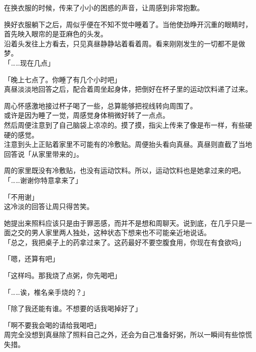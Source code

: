 在换衣服的时候，传来了小小的困惑的声音，让周感到非常抱歉。\\

\vspace{2\baselineskip}

换好衣服躺下之后，周似乎便在不知不觉中睡着了。当他使劲睁开沉重的眼睛时，首先映入眼帘的是亚麻色的头发。\\

沿着头发往上方看去，只见真昼静静站着看着周。看来刚刚发生的一切都不是做梦。\\

「……现在几点」

「晚上七点了。你睡了有几个小时吧」\\

真昼淡淡地回答之后，配合着周坐起身体，把倒好在杯子里的运动饮料递了过来。

周心怀感激地接过杯子喝了一些，总算能够把视线转向周围了。\\

或许是因为睡了一觉，周感觉身体稍微好转了一点点。\\

然后周便注意到了自己脑袋上凉凉的。摸了摸，指尖上传来了像是布一样，有些硬硬的感觉。\\

注意到头上正贴着家里不可能有的冷敷贴。周便抬头看向真昼。真昼则直截了当地回答说「从家里带来的」。

周的家里既没有冷敷贴，也没有运动饮料。所以，运动饮料也是她拿过来的吧。\\

「……谢谢你特意拿来了」

「不用谢」\\

这冷淡的回答让周只得苦笑。

她提出来照料应该只是由于罪恶感，而并不是想和周聊天。说到底，在几乎只是一面之交的男人家里两人独处，这种状态下想来也不可能亲近地说话。\\

「总之，我把桌子上的药拿过来了。这药最好不要空腹食用，你现在有食欲吗」

「嗯，还算有吧」

「这样吗。那我烧了点粥，你先喝吧」

「……诶，椎名亲手烧的？」

「除了我还能有谁。不想要的话我喝掉好了」

「啊不要我会喝的请给我喝吧」\\

周完全没想到真昼除了照料自己之外，还会为自己准备好粥，所以一瞬间有些惊慌失措。

